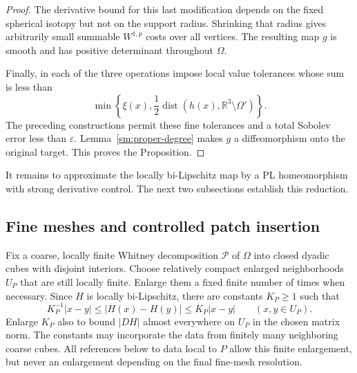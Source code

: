\documentclass[11pt]{article}
\numberwithin{equation}{section}
\theoremstyle{definition}
\theoremstyle{remark}
\begin{document}
\begin{proof}
The derivative bound for this last modification depends on the
fixed spherical isotopy but not on the support radius.  Shrinking
that radius gives arbitrarily small summable $W^{1,p}$ costs
over all vertices.  The resulting map $g$ is smooth and has
positive determinant throughout $\Omega$.

Finally, in each of the three operations impose local value
tolerances whose sum is less than
\[
 \min\!\left\{\xi(x),\frac12
 \operatorname{dist}(h(x),\mathbb R^3\setminus\Omega')\right\}.
\]
The preceding constructions permit these fine tolerances and a
total Sobolev error less than $\varepsilon$.  Lemma~\ref{sm:proper-degree}
makes $g$ a diffeomorphism onto the original target.  This proves
the Proposition.
\end{proof}

It remains to approximate the locally bi-Lipschitz map by a PL
homeomorphism with strong derivative control.  The next two
subsections establish this reduction.

\subsection{Fine meshes and controlled patch insertion}

Fix a coarse, locally finite Whitney decomposition $\mathcal P$ of
$\Omega$ into closed dyadic cubes with disjoint interiors.  Choose
relatively compact enlarged neighborhoods $U_P$ that are still locally
finite.  Enlarge them a fixed finite number of times when necessary.
Since $H$ is locally bi-Lipschitz, there are constants $K_P\ge1$ such
that
\begin{equation}
 \label{sm:coarse-bilip}
 K_P^{-1}|x-y|\le |H(x)-H(y)|\le K_P|x-y|
 \qquad(x,y\in U_P).
\end{equation}
Enlarge $K_P$ also to bound $|DH|$ almost everywhere on $U_P$ in the
chosen matrix norm.  The constants may incorporate the data from finitely many neighboring
coarse cubes.  All references below to data local to $P$ allow this
finite enlargement, but never an enlargement depending on the final
fine-mesh resolution.
\end{document}
